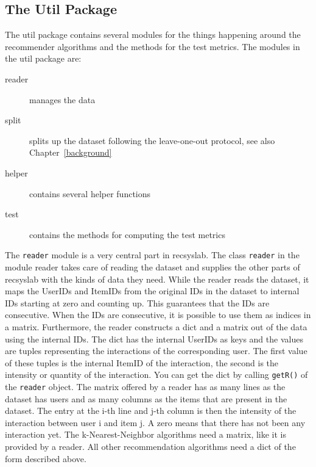 \subsection*{The Util Package}
The util package contains several modules for the things happening around the 
recommender algorithms and the methods for the test metrics.
The modules in the util package are:
\begin{description}
\item[reader] manages the data
\item[split] splits up the dataset following the leave-one-out protocol, see also Chapter~\ref{background}
\item[helper] contains several helper functions
\item[test] contains the methods for computing the test metrics
\end{description}
The \lstinline!reader! module is a very central part in recsyslab.
The class \lstinline!reader! in the module reader takes care of reading the dataset and 
supplies the other parts of recsyslab with the kinds of data they need.
While the reader reads the dataset, it maps the UserIDs and 
ItemIDs from the original IDs in the dataset to internal IDs 
starting at zero and counting up. This guarantees that the IDs are consecutive. 
When the IDs are consecutive, it is possible to use them as
indices in a matrix.
Furthermore, the reader constructs a dict and a matrix
out of the data using the internal IDs. The dict has the internal 
UserIDs as keys and the values are tuples representing the 
interactions of the corresponding user. The first value of these tuples is the internal
ItemID of the interaction, the second is the intensity or
quantity of the interaction. You can get the dict by calling \lstinline!getR()!
of the \lstinline!reader! object.
The matrix offered by a reader has as many lines as the dataset
has users and as many columns as the items that are present in the dataset.
The entry at the i-th line and j-th column is then the intensity of the interaction
between user i and item j. A zero means that there has not been any
interaction yet.
The k-Nearest-Neighbor algorithms need a matrix, like it is provided by a
reader. All other recommendation algorithms need a dict of the 
form described above.

